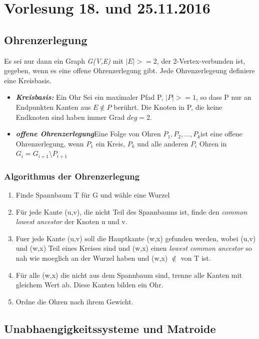 \section{Vorlesung 18. und 25.11.2016}
\subsection{Ohrenzerlegung}

Es sei nur dann ein Graph \textit{G(V,E)} mit $|E|>=2$, der 2-Vertex-verbunden ist, gegeben, wenn es eine offene Ohrenzerlegung gibt. Jede Ohrenzerlegeung definiere eine Kreisbasis.

\begin{itemize}
	\item \textbf{\textit{Kreisbasis:}} \newline Ein Ohr Sei ein maximaler Pfad P, $|P| >= 1$, so dass P nur an Endpunkten Kanten aus $E\notin P$ berührt. Die Knoten in P, die keine Endknoten sind haben immer Grad $deg = 2$.
	\item \textbf{\textit{offene Ohrenzerlegung}}\newline Eine Folge von Ohren $P_1, P_2, ..., P_k$ist eine offene Ohrenzerlegung, wenn $P_1$ ein Kreis, $P_k$ und alle anderen $P_i$ Ohren in $G_i = G_{i+1} \setminus P_{i+1}$ 
\end{itemize}
\subsubsection{Algorithmus der Ohrenzerlegung}
\begin{enumerate}
	\item Finde Spannbaum T für G und wähle eine Wurzel
	\item Für jede Kante (u,v), die nicht Teil des Spannbaums ist, finde den \textit{common lowest ancestor} der Knoten u und v.
	\item Fuer jede Kante (u,v) soll die Hauptkante (w,x) gefunden werden, wobei (u,v) und (w,x) Teil eines Kreises sind und (w,x) einen \textit{lowest common ancestor} so nah wie moeglich an der Wurzel haben und (w,x) $\notin$ von T ist.
	\item Für alle (w,x) die nicht aus dem Spannbaum sind, trenne alle Kanten mit gleichem Wert ab. Diese Kanten bilden ein Ohr.
	\item Ordne die Ohren nach ihrem Gewicht. 
\end{enumerate}
\subsection{Unabhaengigkeitssysteme und Matroide}

